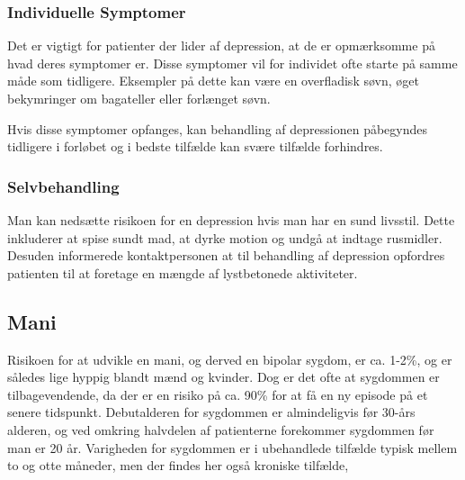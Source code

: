 \subsubsection{Individuelle Symptomer}
Det er vigtigt for patienter der lider af depression, at de er opmærksomme på hvad deres symptomer er.
Disse symptomer vil for individet ofte starte på samme måde som tidligere.
Eksempler på dette kan være en overfladisk søvn, øget bekymringer om bagateller eller forlænget søvn.

Hvis disse symptomer opfanges, kan behandling af depressionen påbegyndes tidligere i forløbet og i bedste tilfælde kan svære tilfælde forhindres.
\subsubsection{Selvbehandling}
Man kan nedsætte risikoen for en depression hvis man har en sund livsstil.
Dette inkluderer at spise sundt mad, at dyrke motion og undgå at indtage rusmidler.
Desuden informerede kontaktpersonen \citet{misc:janne-rasmussen} at til behandling af depression opfordres patienten til at foretage en mængde af lystbetonede aktiviteter.

\subsection{Mani}
Risikoen for at udvikle en mani, og derved en bipolar sygdom, er ca. 1-2\%, og er således lige hyppig blandt mænd og kvinder.
Dog er det ofte at sygdommen er tilbagevendende, da der er en risiko på ca. 90\% for at få en ny episode på et senere tidspunkt.
Debutalderen for sygdommen er almindeligvis før 30-års alderen, og ved omkring halvdelen af patienterne forekommer sygdommen før man er 20 år.
Varigheden for sygdommen er i ubehandlede tilfælde typisk mellem to og otte måneder, men der findes her også kroniske tilfælde,

